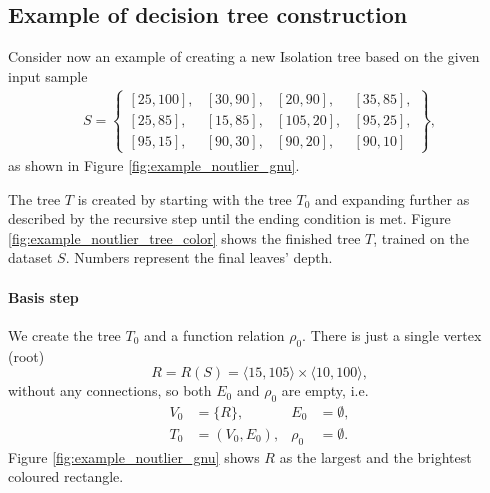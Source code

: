 \subsection{Example of decision tree construction}
\label{example:original_tree_create}
Consider now an example of creating a new Isolation tree based on the given input sample
\begin{align*}
    S = \left\{\begin{smallmatrix}
    [25,100],&[30,90],&[20,90],&[35,85],\\
    [25,85],&[15,85],&[105,20],&[95,25], \\
    [95,15],&[90,30],&[90,20],&[90,10]
    \end{smallmatrix}\right\},
\end{align*}
as shown in Figure \ref{fig:example_noutlier_gnu}.

\begin{figure*}[!t]
\centering

\caption{Original solution. Rectangles created by recursive splitting.}
\label{fig:example_noutlier_gnu}
\end{figure*}



The tree $T$ is created by starting with the tree $T_0$ and expanding further as described by the recursive step until the ending condition is met.
Figure \ref{fig:example_noutlier_tree_color} shows the finished tree $T$, trained on the dataset $S$. Numbers represent the final leaves’ depth.

\paragraph{Basis step} 
We create the tree $T_0$ and a function relation $\rho_0$.
   There is just a single vertex (root) 
   \[R = R(S) = \langle 15, 105 \rangle \times \langle 10, 100 \rangle,\]
   without any connections, so both $E_0$ and $\rho_0$ are empty, i.e.
\begin{align*}
V_0 &= \{R\},& E_0 &= \emptyset,\\
T_0 &= (V_0, E_0),& \rho_0 &= \emptyset.
\end{align*}
Figure \ref{fig:example_noutlier_gnu} shows $R$ as the largest and the brightest coloured rectangle.

